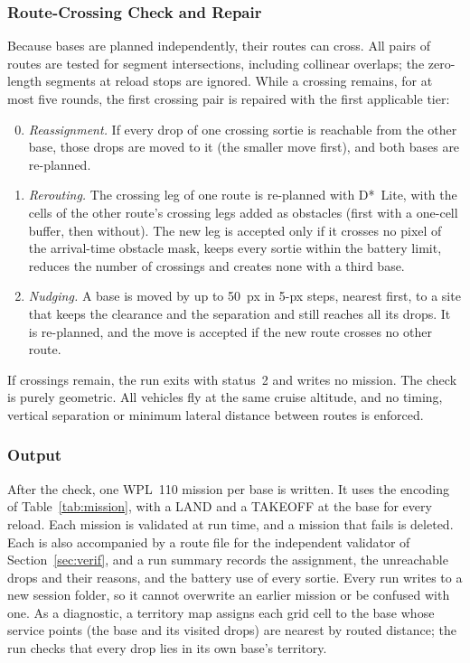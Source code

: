 \subsubsection{Route-Crossing Check and Repair}
Because bases are planned independently, their routes can cross. All pairs of routes are tested for segment intersections, including collinear overlaps; the zero-length segments at reload stops are ignored. While a crossing remains, for at most five rounds, the first crossing pair is repaired with the first applicable tier:
\begin{enumerate}
\setcounter{enumi}{-1}
\item \emph{Reassignment.} If every drop of one crossing sortie is reachable from the other base, those drops are moved to it (the smaller move first), and both bases are re-planned.
\item \emph{Rerouting.} The crossing leg of one route is re-planned with D*~Lite, with the cells of the other route's crossing legs added as obstacles (first with a one-cell buffer, then without). The new leg is accepted only if it crosses no pixel of the arrival-time obstacle mask, keeps every sortie within the battery limit, reduces the number of crossings and creates none with a third base.
\item \emph{Nudging.} A base is moved by up to 50~px in 5-px steps, nearest first, to a site that keeps the clearance and the separation and still reaches all its drops. It is re-planned, and the move is accepted if the new route crosses no other route.
\end{enumerate}
If crossings remain, the run exits with status~2 and writes no mission. The check is purely geometric. All vehicles fly at the same cruise altitude, and no timing, vertical separation or minimum lateral distance between routes is enforced.

\subsubsection{Output}
After the check, one WPL~110 mission per base is written. It uses the encoding of Table~\ref{tab:mission}, with a LAND and a TAKEOFF at the base for every reload. Each mission is validated at run time, and a mission that fails is deleted. Each is also accompanied by a route file for the independent validator of Section~\ref{sec:verif}, and a run summary records the assignment, the unreachable drops and their reasons, and the battery use of every sortie. Every run writes to a new session folder, so it cannot overwrite an earlier mission or be confused with one. As a diagnostic, a territory map assigns each grid cell to the base whose service points (the base and its visited drops) are nearest by routed distance; the run checks that every drop lies in its own base's territory.

